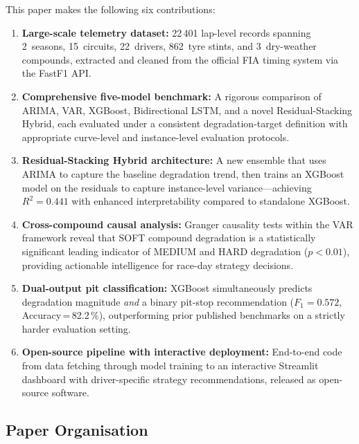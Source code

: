 \documentclass[journal,twoside]{IEEEtran}
\begin{document}
This paper makes the following six contributions:

\begin{enumerate}
  \item \textbf{Large-scale telemetry dataset:}  22\,401 lap-level
  records spanning 2~seasons, 15~circuits, 22~drivers, 862~tyre stints,
  and 3~dry-weather compounds, extracted and cleaned from the official
  FIA timing system via the FastF1 API.

  \item \textbf{Comprehensive five-model benchmark:}  A rigorous
  comparison of ARIMA, VAR, XGBoost, Bidirectional LSTM, and a novel
  Residual-Stacking Hybrid, each evaluated under a consistent
  degradation-target definition with appropriate curve-level and
  instance-level evaluation protocols.

  \item \textbf{Residual-Stacking Hybrid architecture:}  A new ensemble
  that uses ARIMA to capture the baseline degradation trend, then trains
  an XGBoost model on the residuals to capture instance-level
  variance---achieving $R^{2}=0.441$ with enhanced interpretability
  compared to standalone XGBoost.

  \item \textbf{Cross-compound causal analysis:}  Granger causality
  tests within the VAR framework reveal that SOFT compound degradation
  is a statistically significant leading indicator of MEDIUM and HARD
  degradation ($p<0.01$), providing actionable intelligence for
  race-day strategy decisions.

  \item \textbf{Dual-output pit classification:}  XGBoost simultaneously
  predicts degradation magnitude \emph{and} a binary pit-stop
  recommendation ($F_{1}=0.572$, Accuracy\,=\,82.2\,\%), outperforming
  prior published benchmarks on a strictly harder evaluation setting.

  \item \textbf{Open-source pipeline with interactive deployment:}
  End-to-end code from data fetching through model training to an
  interactive Streamlit dashboard with driver-specific strategy
  recommendations, released as open-source software.
\end{enumerate}

\subsection{Paper Organisation}
\end{document}
